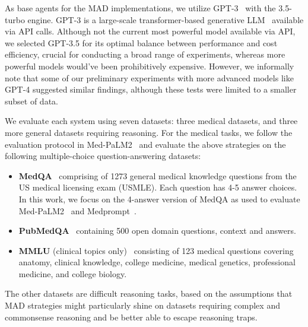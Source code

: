 \documentclass{article}  %
\begin{document}
As base agents for the MAD implementations, we utilize GPT-3~\citep{brown2020language} with the 3.5-turbo engine. GPT-3 is a large-scale transformer-based generative LLM~\citep{vaswani2017attention, kaplan2020scaling} available via API calls. Although not the current most powerful model available via API, we selected GPT-3.5 for its optimal balance between performance and cost efficiency, crucial for conducting a broad range of experiments, whereas more powerful models would've been prohibitively expensive. However, we informally note that some of our preliminary experiments with more advanced models like GPT-4 suggested similar findings, although these tests were limited to a smaller subset of data. %

We evaluate each system using seven datasets: three medical datasets, and three more general datasets requiring reasoning. 
For the medical tasks, we follow the evaluation protocol in Med-PaLM2~\citep{singhal2023medpalm} and evaluate the above strategies on the following multiple-choice question-answering datasets: 
\begin{itemize}[leftmargin=18pt]
    \item \textbf{MedQA}~\citep{jin2021disease} comprising of 1273 general medical knowledge questions from the US medical licensing exam (USMLE). Each question has 4-5 answer choices. In this work, we focus on the 4-answer version of MedQA as used to evaluate Med-PaLM2~\cite{liang2023encouraging} and Medprompt~\cite{nori2023medprompt}.
 \item \textbf{PubMedQA}~\citep{jin2019pubmedqa} containing 500 open domain questions, context and answers. 
 \item \textbf{MMLU} (clinical topics only)~\citep{hendrycks2020measuring} consisting of 123 medical questions covering anatomy, clinical knowledge, college medicine, medical genetics, professional medicine, and college biology.
\end{itemize}

The other datasets are difficult reasoning tasks, based on the assumptions that MAD strategies might particularly shine on datasets requiring complex and commonsense reasoning and be better able to escape reasoning traps.
\end{document}
